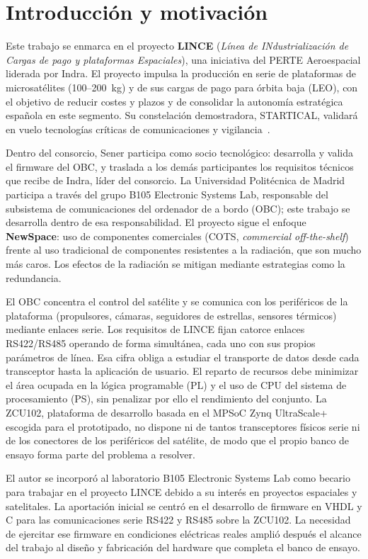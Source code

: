 \section{Introducción y motivación}

Este trabajo se enmarca en el proyecto \textbf{LINCE} (\textit{Línea de INdustrialización de
Cargas de pago y plataformas Espaciales}), una iniciativa del PERTE Aeroespacial liderada por
Indra. El proyecto impulsa la producción en serie de plataformas de microsatélites
(100--200~kg) y de sus cargas de pago para órbita baja (LEO), con el objetivo de reducir costes y
plazos y de consolidar la autonomía estratégica española en este segmento. Su constelación
demostradora, STARTICAL, validará en vuelo tecnologías críticas de comunicaciones y
vigilancia~\cite{indra2026lince}.

Dentro del consorcio, Sener participa como socio tecnológico: desarrolla y valida el firmware
del OBC, y traslada a los demás participantes los requisitos técnicos que recibe de Indra,
líder del consorcio. La
Universidad Politécnica de Madrid participa a través del grupo B105 Electronic Systems Lab,
responsable del subsistema de comunicaciones del ordenador de a bordo (OBC); este trabajo se
desarrolla dentro de esa responsabilidad. El proyecto sigue el enfoque \textbf{NewSpace}: uso de
componentes comerciales (COTS, \textit{commercial off-the-shelf}) frente al uso tradicional de componentes resistentes a la radiación,
que son mucho más caros. Los efectos de la radiación
se mitigan mediante estrategias como la redundancia.

El OBC concentra el control del satélite y se comunica con los periféricos de la plataforma
(propulsores, cámaras, seguidores de estrellas, sensores térmicos) mediante enlaces serie.
Los requisitos de LINCE fijan catorce enlaces RS422/RS485 operando de forma simultánea, cada uno
con sus propios parámetros de línea. Esa cifra obliga a estudiar el transporte de datos desde
cada transceptor hasta la aplicación de usuario. El reparto de recursos debe minimizar el área
ocupada en la lógica programable (PL) y el uso de CPU del sistema de procesamiento (PS), sin
penalizar por ello el rendimiento del conjunto. La ZCU102, plataforma de desarrollo basada en el
MPSoC Zynq UltraScale+ escogida para el prototipado, no dispone ni de tantos transceptores físicos
serie ni de los conectores de los periféricos del satélite, de modo que el propio banco de ensayo
forma parte del problema a resolver.

El autor se incorporó al laboratorio B105 Electronic Systems Lab como becario para trabajar en
el proyecto LINCE debido a su interés en proyectos espaciales y satelitales. La aportación
inicial se centró en el desarrollo de firmware en VHDL y C para las comunicaciones serie RS422 y
RS485 sobre la ZCU102. La necesidad de ejercitar ese firmware en condiciones eléctricas reales
amplió después el alcance del trabajo al diseño y fabricación del hardware que completa el banco
de ensayo.



